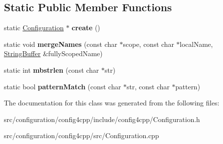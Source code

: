 \subsection*{Static Public Member Functions}
\begin{DoxyCompactItemize}
\item 
\hypertarget{classCONFIG4CPP__NAMESPACE_1_1Configuration_afc76ea7c7408eaa284f7f78280d7ea0a}{static \hyperlink{classCONFIG4CPP__NAMESPACE_1_1Configuration}{Configuration} $\ast$ {\bfseries create} ()}\label{classCONFIG4CPP__NAMESPACE_1_1Configuration_afc76ea7c7408eaa284f7f78280d7ea0a}

\item 
\hypertarget{classCONFIG4CPP__NAMESPACE_1_1Configuration_a80e05a00907f4120cd854a0e9eb3a984}{static void {\bfseries merge\-Names} (const char $\ast$scope, const char $\ast$local\-Name, \hyperlink{classCONFIG4CPP__NAMESPACE_1_1StringBuffer}{String\-Buffer} \&fully\-Scoped\-Name)}\label{classCONFIG4CPP__NAMESPACE_1_1Configuration_a80e05a00907f4120cd854a0e9eb3a984}

\item 
\hypertarget{classCONFIG4CPP__NAMESPACE_1_1Configuration_a1f2a054198d9049975b20fc321f276b7}{static int {\bfseries mbstrlen} (const char $\ast$str)}\label{classCONFIG4CPP__NAMESPACE_1_1Configuration_a1f2a054198d9049975b20fc321f276b7}

\item 
\hypertarget{classCONFIG4CPP__NAMESPACE_1_1Configuration_a53dbcaf469fb63b08343575c983d16f6}{static bool {\bfseries pattern\-Match} (const char $\ast$str, const char $\ast$pattern)}\label{classCONFIG4CPP__NAMESPACE_1_1Configuration_a53dbcaf469fb63b08343575c983d16f6}

\end{DoxyCompactItemize}


The documentation for this class was generated from the following files\-:\begin{DoxyCompactItemize}
\item 
src/configuration/config4cpp/include/config4cpp/Configuration.\-h\item 
src/configuration/config4cpp/src/Configuration.\-cpp\end{DoxyCompactItemize}
